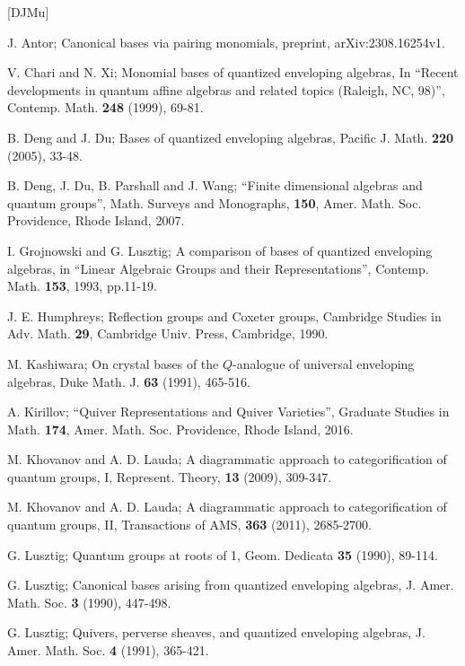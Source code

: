 \documentclass[12pt]{amsart}
\renewcommand{\1}{\mathbb 1}
\numberwithin{equation}{section}
\begin{document}
\par\bigskip
\begin{thebibliography}{[DJMu]}

 J. Antor; Canonical bases via pairing monomials,
preprint, arXiv:2308.16254v1.  

 V. Chari and N. Xi; Monomial bases of quantized enveloping algebras,
In ``Recent developments in quantum affine algebras and related topics (Raleigh, NC, 98)'',
Contemp. Math. {\bf 248} (1999), 69-81.

 B. Deng and J. Du; Bases of quantized enveloping algebras,   
Pacific J. Math. {\bf 220} (2005), 33-48.  
  
  B. Deng, J. Du, B. Parshall and J. Wang; ``Finite dimensional
algebras and quantum groups'', Math. Surveys and Monographs, {\bf 150}, Amer. Math. Soc.
Providence, Rhode Island, 2007.  
  
 I. Grojnowski and G. Lusztig; A comparison of bases of
  quantized enveloping algebras, in ``Linear Algebraic Groups and their Representations'',
  Contemp. Math. {\bf 153}, 1993, pp.11-19. 

 J. E. Humphreys; Reflection groups and Coxeter groups, Cambridge
Studies in Adv. Math. {\bf 29}, Cambridge Univ. Press, Cambridge, 1990.  

 M. Kashiwara; On crystal bases of the $Q$-analogue of
  universal enveloping algebras, Duke Math. J. {\bf 63} (1991), 465-516. 

 A. Kirillov; ``Quiver Representations and Quiver Varieties'', 
Graduate Studies in Math. {\bf 174}, Amer. Math. Soc. Providence, Rhode Island, 2016.
  
 M. Khovanov and A. D. Lauda; A diagrammatic approach 
to categorification of quantum groups, I, Represent. Theory, {\bf 13} (2009),
309-347.

 M. Khovanov and A. D. Lauda; A diagrammatic approach to
categorification of quantum groups, II, Transactions of AMS, {\bf 363} (2011),
2685-2700.
  
 G. Lusztig; Quantum groups at roots of 1, Geom. Dedicata {\bf 35}
(1990), 89-114. 

 G. Lusztig; Canonical bases arising from quantized enveloping algebras,
J. Amer. Math. Soc. {\bf 3} (1990), 447-498.  

 G. Lusztig; Quivers, perverse sheaves, and quantized enveloping algebras,
J. Amer. Math. Soc. {\bf 4} (1991), 365-421.


\end{thebibliography}
\end{document}
